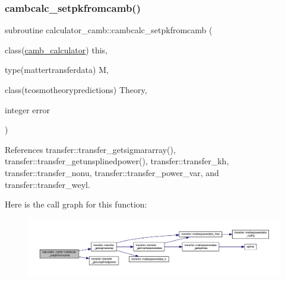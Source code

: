 \mbox{\label{namespacecalculator__camb_a8e6f706ddb3ae930a9f1293d9c480405}} 
\subsubsection{\texorpdfstring{cambcalc\+\_\+setpkfromcamb()}{cambcalc\_setpkfromcamb()}}
{\footnotesize\ttfamily subroutine calculator\+\_\+camb\+::cambcalc\+\_\+setpkfromcamb (\begin{DoxyParamCaption}\item[{class(\mbox{\hyperlink{structcalculator__camb_1_1camb__calculator}{camb\+\_\+calculator}})}]{this,  }\item[{type(mattertransferdata)}]{M,  }\item[{class(tcosmotheorypredictions)}]{Theory,  }\item[{integer}]{error }\end{DoxyParamCaption})}



References transfer\+::transfer\+\_\+getsigmararray(), transfer\+::transfer\+\_\+getunsplinedpower(), transfer\+::transfer\+\_\+kh, transfer\+::transfer\+\_\+nonu, transfer\+::transfer\+\_\+power\+\_\+var, and transfer\+::transfer\+\_\+weyl.

Here is the call graph for this function\+:
\nopagebreak
\begin{figure}[H]
\begin{center}
\leavevmode
\includegraphics[width=350pt]{namespacecalculator__camb_a8e6f706ddb3ae930a9f1293d9c480405_cgraph}
\end{center}
\end{figure}
\mbox{\label{namespacecalculator__camb_a7ccabec132f8bbe50ac91abdd4a86751}} 
